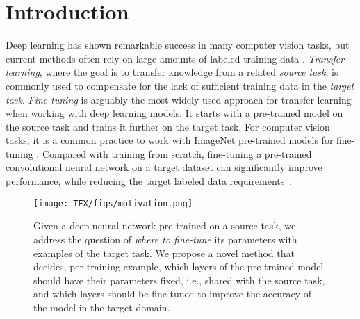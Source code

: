 \documentclass[10pt,twocolumn,letterpaper]{article}
\begin{document}
\section{Introduction}
Deep learning has shown remarkable success in many computer vision tasks, but current methods often rely on large amounts of labeled training data \cite{krizhevsky2012imagenet, he2016deep,huang2017densely}. \emph{Transfer learning}, where the goal is to transfer knowledge from a related \emph{source task}, is commonly used to compensate for the lack of sufficient training data in the \emph{target task}\cite{pan2010survey, bengio2012deep}. \emph{Fine-tuning} is arguably the most widely used approach for transfer learning when working with deep learning models. %
It starts with a pre-trained model on the source task and trains it further on the target task. For computer vision tasks, it is a common practice to work with ImageNet pre-trained models for fine-tuning \cite{kornblith2018better}. Compared with training from scratch, fine-tuning a pre-trained convolutional neural network on a target dataset can significantly improve performance, while reducing the target labeled data %
requirements~\cite{girshick2014rich, yosinski2014transferable,tajbakhsh2016convolutional, kornblith2018better}.

\begin{figure}[!htb]
    \centering
\texttt{[image: TEX/figs/motivation.png]}    \caption{Given a deep neural network pre-trained on a source task, we address the question of {\em where to fine-tune} its parameters with examples of the target task. We propose a novel method that decides, per training example, which layers of the pre-trained model should have their parameters fixed, i.e., shared with the source task, and which layers should be fine-tuned to improve the accuracy of the model in the target domain.}
    \label{fig:motivation}
\end{figure}
\end{document}
